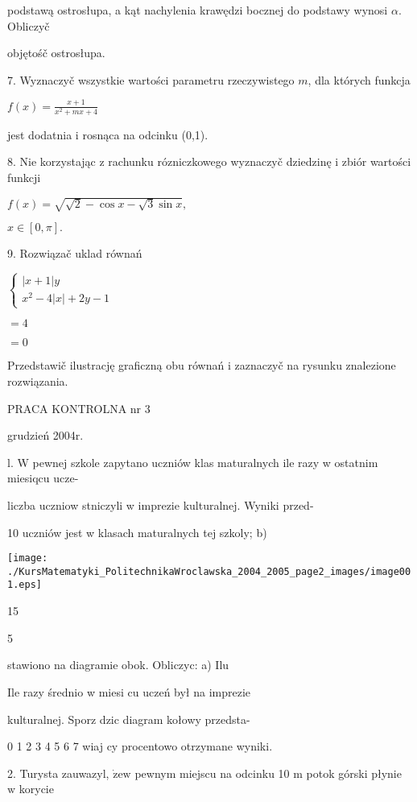 \documentclass[a4paper,12pt]{article}
\begin{document}
podstawą ostrosłupa, a kąt nachylenia krawędzi bocznej do podstawy wynosi $\alpha$. Obliczyč

objętośč ostrosłupa.

7. Wyznaczyč wszystkie wartości parametru rzeczywistego $m$, dla których funkcja

$f(x)=\displaystyle \frac{x+1}{x^{2}+mx+4}$

jest dodatnia i rosnąca na odcinku (0,1).

8. Nie korzystając z rachunku rózniczkowego wyznaczyč dziedzinę i zbiór wartości funkcji

$f(x)=\sqrt{\sqrt{2}-\cos x-\sqrt{3}\sin x},$

$x\in[0,\pi].$

9. Rozwiązač uklad równań

$\left\{\begin{array}{l}
|x+1|y\\
x^{2}-4|x|+2y-1
\end{array}\right.$

$=4$

$=0$

Przedstawič ilustrację graficzną obu równań i zaznaczyč na rysunku znalezione rozwiązania.





PRACA KONTROLNA nr 3

grudzień 2004r.

l. W pewnej szkole zapytano uczniów klas maturalnych ile razy w ostatnim miesiqcu ucze-

liczba uczniow stniczyli w imprezie kulturalnej. Wyniki przed-

10 uczniów jest w klasach maturalnych tej szkoly; b)
\begin{center}
\texttt{[image: ./KursMatematyki\_PolitechnikaWroclawska\_2004\_2005\_page2\_images/image001.eps]}
\end{center}
15

5

stawiono na diagramie obok. Obliczyc: a) Ilu

Ile razy średnio w miesi cu uczeń był na imprezie

kulturalnej. Sporz dzic diagram kołowy przedsta-

0 1 2 3 4 5 6 7 wiaj cy procentowo otrzymane wyniki.

2. Turysta zauwazyl, $\dot{\mathrm{z}}\mathrm{e}\mathrm{w}$ pewnym miejscu na odcinku 10 $\mathrm{m}$ potok górski płynie $\mathrm{w}$ korycie
\end{document}
